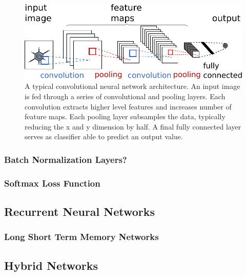 	\begin{figure}[]
  		\centering
    	\includegraphics[width=\textwidth, keepaspectratio]{img/convnet.pdf}
    	\caption{A typical convolutional neural network architecture. An input image is fed through a series of convolutional and pooling layers. Each convolution extracts higher level features and increases number of feature maps. Each pooling layer subsamples the data, typically reducing the x and y dimension by half. A final fully connected layer serves as classifier able to predict an output value.}
    	\label{fig:convnet}
	\end{figure}

\subsubsection{Batch Normalization Layers?}
\subsubsection{Softmax Loss Function}

\subsection{Recurrent Neural Networks}
\subsubsection{Long Short Term Memory Networks}

\subsection{Hybrid Networks}
\label{sec:hybrid_networks}

